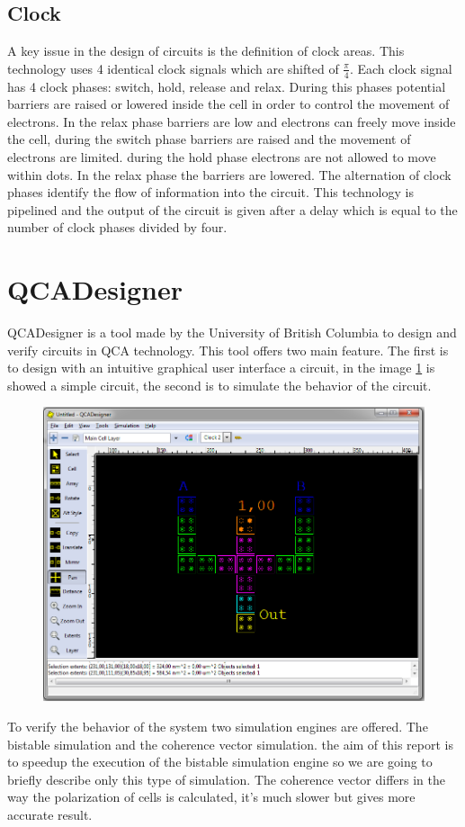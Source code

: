 \subsection{Clock}
\label{delay}
A key issue in the design of circuits is the definition of clock areas. This technology uses 4 identical clock signals which are shifted of $\frac{\pi}{4}$. Each clock signal has 4 clock phases: switch, hold, release and relax. During this phases potential barriers are raised or lowered inside the cell in order to control the movement of electrons. In the relax phase barriers are low and electrons can freely move inside the cell, during the switch phase barriers are raised and the movement of electrons are limited. during the hold phase electrons are not allowed to move within dots. In the relax phase the barriers are lowered. The alternation of clock phases identify the flow of information into the circuit. \newline
This technology is pipelined and the output of the circuit is given after a delay which is equal to the number of clock phases divided by four.

\section{QCADesigner}
QCADesigner is a tool made by the University of British Columbia to design and verify circuits in QCA technology. This tool offers two main feature. The first is to design with an intuitive graphical user interface a circuit, in the image \ref{img:ambiente} is showed a simple circuit, the second is to simulate the behavior of the circuit. 

\begin{figure}
\centering
\includegraphics[scale=0.4]{img/QCADesigner.png}
\label{img:ambiente}
\end{figure}
To verify the behavior of the system two simulation engines are offered. The bistable simulation and the coherence vector simulation. the aim of this report is to speedup the execution of the bistable simulation engine so we are going to briefly describe only this type of simulation. The coherence vector differs in the way the polarization of cells is calculated, it's much slower but gives more accurate result.


